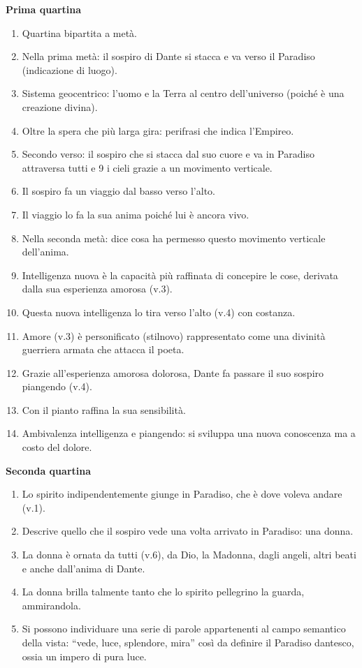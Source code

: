 \documentclass{article}
\begin{document}
\textbf{Prima quartina}
\begin{enumerate}
    \item Quartina bipartita a metà.
    \item Nella prima metà: il sospiro di Dante si stacca e va verso il Paradiso (indicazione di luogo).
    \item Sistema geocentrico: l'uomo e la Terra al centro dell'universo (poiché è una creazione divina).
    \item Oltre la spera che più larga gira: perifrasi che indica l'Empireo.
    \item Secondo verso: il sospiro che si stacca dal suo cuore e va in Paradiso attraversa tutti e 9 i cieli grazie a un movimento verticale.
    \item Il sospiro fa un viaggio dal basso verso l'alto.
    \item Il viaggio lo fa la sua anima poiché lui è ancora vivo.
    \item Nella seconda metà: dice cosa ha permesso questo movimento verticale dell'anima.
    \item Intelligenza nuova è la capacità più raffinata di concepire le cose, derivata dalla sua esperienza amorosa (v.3).
    \item Questa nuova intelligenza lo tira verso l'alto (v.4) con costanza.
    \item Amore (v.3) è personificato (stilnovo) rappresentato come una divinità guerriera armata che attacca il poeta.
    \item Grazie all'esperienza amorosa dolorosa, Dante fa passare il suo sospiro piangendo (v.4).
    \item Con il pianto raffina la sua sensibilità.
    \item Ambivalenza intelligenza e piangendo: si sviluppa una nuova conoscenza ma a costo del dolore.
\end{enumerate}

\textbf{Seconda quartina}
\begin{enumerate}
    \item Lo spirito indipendentemente giunge in Paradiso, che è dove voleva andare (v.1).
    \item Descrive quello che il sospiro vede una volta arrivato in Paradiso: una donna.
    \item La donna è ornata da tutti (v.6), da Dio, la Madonna, dagli angeli, altri beati e anche dall'anima di Dante.
    \item La donna brilla talmente tanto che lo spirito pellegrino la guarda, ammirandola.
    \item Si possono individuare una serie di parole appartenenti al campo semantico della vista: ``vede, luce, splendore, mira'' così da definire il Paradiso dantesco, ossia un impero di pura luce.
\end{enumerate}
\end{document}
